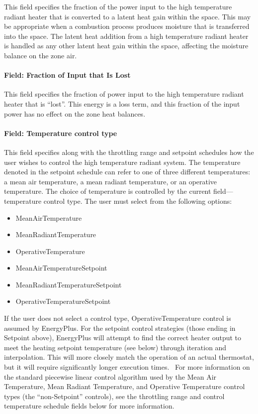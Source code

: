 This field specifies the fraction of the power input to the high temperature radiant heater that is converted to a latent heat gain within the space. This may be appropriate when a combustion process produces moisture that is transferred into the space. The latent heat addition from a high temperature radiant heater is handled as any other latent heat gain within the space, affecting the moisture balance on the zone air.

\paragraph{Field: Fraction of Input that Is Lost}\label{field-fraction-of-input-that-is-lost}

This field specifies the fraction of power input to the high temperature radiant heater that is ``lost''. This energy is a loss term, and this fraction of the input power has no effect on the zone heat balances.

\paragraph{Field: Temperature control type}\label{field-temperature-control-type-3}

This field specifies along with the throttling range and setpoint schedules how the user wishes to control the high temperature radiant system. The temperature denoted in the setpoint schedule can refer to one of three different temperatures: a mean air temperature, a mean radiant temperature, or an operative temperature. The choice of temperature is controlled by the current field---temperature control type. The user must select from the following options:

\begin{itemize}
\item
  MeanAirTemperature
\item
  MeanRadiantTemperature
\item
  OperativeTemperature
\item
  MeanAirTemperatureSetpoint
\item
  MeanRadiantTemperatureSetpoint
\item
  OperativeTemperatureSetpoint
\end{itemize}

If the user does not select a control type, OperativeTemperature control is assumed by EnergyPlus. For the setpoint control strategies (those ending in Setpoint above), EnergyPlus will attempt to find the correct heater output to meet the heating setpoint temperature (see below) through iteration and interpolation. This will more closely match the operation of an actual thermostat, but it will require significantly longer execution times.~ For more information on the standard piecewise linear control algorithm used by the Mean Air Temperature, Mean Radiant Temperature, and Operative Temperature control types (the ``non-Setpoint'' controls), see the throttling range and control temperature schedule fields below for more information.

